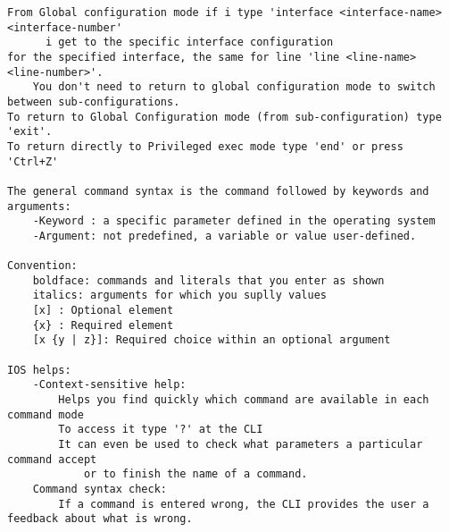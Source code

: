 \documentclass[../EngineeringJournal_CDavis.tex]{subfiles}
\begin{document}
\hspace{0.2cm}
\begin{tcolorbox}[width=6.3in]
\scriptsize 
\begin{verbatim}
From Global configuration mode if i type 'interface <interface-name> <interface-number' 
	  i get to the specific interface configuration
for the specified interface, the same for line 'line <line-name> <line-number>'.
	You don't need to return to global configuration mode to switch between sub-configurations.
To return to Global Configuration mode (from sub-configuration) type 'exit'.
To return directly to Privileged exec mode type 'end' or press 'Ctrl+Z'

The general command syntax is the command followed by keywords and arguments:
	-Keyword : a specific parameter defined in the operating system
	-Argument: not predefined, a variable or value user-defined.

Convention:
	boldface: commands and literals that you enter as shown
	italics: arguments for which you suplly values
	[x] : Optional element
	{x} : Required element
	[x {y | z}]: Required choice within an optional argument

IOS helps:
	-Context-sensitive help:
		Helps you find quickly which command are available in each command mode
		To access it type '?' at the CLI
		It can even be used to check what parameters a particular command accept 
			or to finish the name of a command.
	Command syntax check:
		If a command is entered wrong, the CLI provides the user a feedback about what is wrong.
\end{verbatim}
\end{tcolorbox}
\hspace{0.2cm}
\normalsize  
\end{document}
